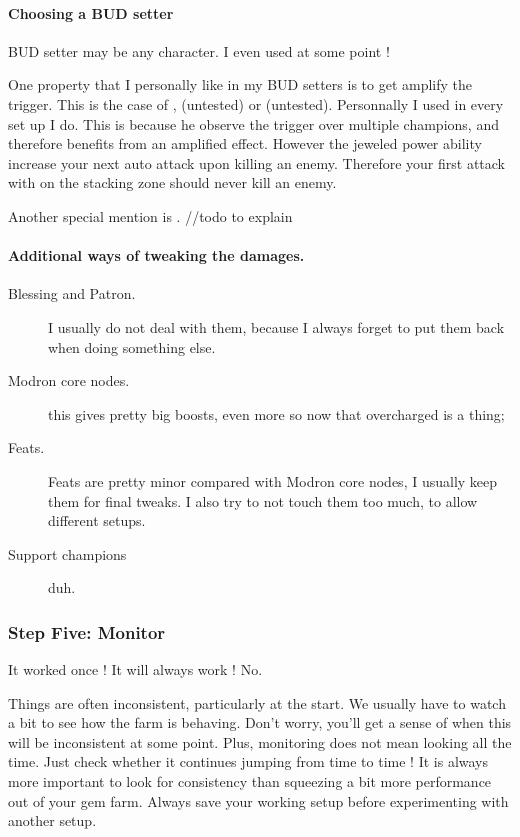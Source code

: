 \documentclass{article}
\begin{document}
\paragraph{Choosing a BUD setter}
BUD setter may be any character.
I even used \nerys at some point !

One property that I personally like in my BUD setters is to get amplify the trigger.
This is the case of \artemis, \arkhan (untested) or \blackViper (untested).
Personnally I used \artemis in every set up I do.
This is because he observe the trigger over multiple champions, and therefore benefits from an amplified effect.
However the jeweled power ability increase your next auto attack upon killing an enemy.
Therefore your first attack with \artemis on the stacking zone should never kill an enemy.

Another special mention is \nahara.
//todo to explain

\paragraph{Additional ways of tweaking the damages.}

\begin{description}
    \item[Blessing and Patron.] I usually do not deal with them, because I always forget to put them back when doing something else.
    \item[Modron core nodes.] this gives pretty big boosts, even more so now that overcharged is a thing;
    \item[Feats.] Feats are pretty minor compared with Modron core nodes, I usually keep them for final tweaks.
    I also try to not touch them too much, to allow different setups.
    \item[Support champions] duh.
\end{description}


\subsubsection{Step Five: Monitor}
\label{sec:stepFive}

It worked once !\newline
It will always work !\newline
No.\newline

Things are often inconsistent, particularly at the start.
We usually have to watch a bit to see how the farm is behaving.
Don't worry, you'll get a sense of when this will be inconsistent at some point.
Plus, monitoring does not mean looking all the time.
Just check whether it continues jumping from time to time !
It is always more important to look for consistency than squeezing a bit more performance out of your gem farm.
Always save your working setup before experimenting with another setup.
\end{document}
